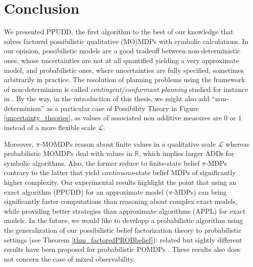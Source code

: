 \section{Conclusion} 
We presented PPUDD, the first algorithm to the best of our knowledge that 
solves factored possibilistic qualitative (MO)MDPs with symbolic calculations. In our opinion,
possibilistic models are a good tradeoff between non-deterministic ones, whose
uncertainties are not at all quantified yielding a very approximate model, and
probabilistic ones, where uncertainties are fully specified,
sometimes arbitrarily in practice. 
The resolution of planning problems 
using the framework of non-determinism 
is called \textit{contingent/conformant planning} 
studied for instance in \cite{Albore_atranslation-based,bonet2014flexible}.
By the way, in the introduction of this thesis,
we might also add ``non-determinism''
as a particular case of Possibility Theory
in Figure \ref{uncertainty_theories},
as values of associated non additive measures
are $0$ or $1$ instead of a more flexible scale $\mathcal{L}$.

Moreover,
$\pi$-MOMDPs reason about finite values in a qualitative scale $\mathcal{L}$ whereas
probabilistic MOMDPs deal with values in $\mathbb{R}$, which implies larger ADDs
for symbolic algorithms. Also, the former reduce to finite-state belief
$\pi$-MDPs contrary to the latter that yield \emph{continuous}-state belief MDPs
of significantly higher complexity. Our experimental results highlight the point that using an
exact algorithm (PPUDD) for an approximate model ($\pi$-MDPs) can bring significantly faster computations
than reasoning about complex exact models, while providing better
strategies than approximate algorithms (APPL) for exact models. 
In the future, we would like to developp a probabilistic algorithm using 
the generalization of our possibilistic belief factorization theory to
probabilistic settings (see Theorem \ref{thm_factoredPROBbelief}): 
related but sightly different results have been proposed for
probabilistic POMDPs \cite{DBLP:conf/aips/ShaniPBS08,Poupart:2005:phd}. 
These results also does not concern 
the case of mixed observability.

